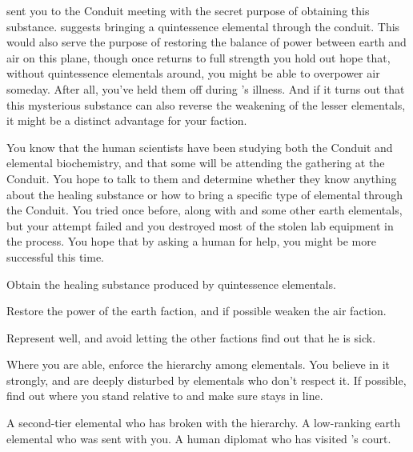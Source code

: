\documentclass[char]{elementals}
\begin{document}
\cEarthKing{} sent you to the Conduit meeting with the secret purpose of obtaining this substance.  \cEarthKing{\They} suggests bringing a quintessence elemental through the conduit.  This would also serve the purpose of restoring the balance of power between earth and air on this plane, though once \cEarthKing{} returns to full strength you hold out hope that, without quintessence elementals around, you might be able to overpower air someday.  After all, you've held them off during \cEarthKing{}'s illness.  And if it turns out that this mysterious substance can also reverse the weakening of the lesser elementals, it might be a distinct advantage for your faction.

You know that the human scientists have been studying both the Conduit and elemental biochemistry, and that some will be attending the gathering at the Conduit.  You hope to talk to them and determine whether they know anything about the healing substance or how to bring a specific type of elemental through the Conduit.  You tried once before, along with \cMinion{} and some other earth elementals, but your attempt failed and you destroyed most of the stolen lab equipment in the  process.  You hope that by asking a human for help, you might be more successful this time.

\begin{itemz}[Goals]
	\item Obtain the healing substance produced by quintessence elementals.
	\item Restore the power of the earth faction, and if possible weaken the air faction.
	\item Represent \cEarthKing{} well, and avoid letting the other factions find out that he is sick.
	\item Where you are able, enforce the hierarchy among elementals.  You believe in it strongly, and are deeply disturbed by elementals who don't respect it.  If possible, find out where you stand relative to \cRogue{} and make sure \cMinion{} stays in line.
\end{itemz}
 
\begin{contacts}
	\contact{\cRogue{}}  A second-tier elemental who has broken with the hierarchy.
	\contact{\cMinion{}}  A low-ranking earth elemental who was sent with you.
  \contact{\cAvatar{}}  A human diplomat who has visited \cEarthKing{}'s court.
\end{contacts} 
\end{document}
